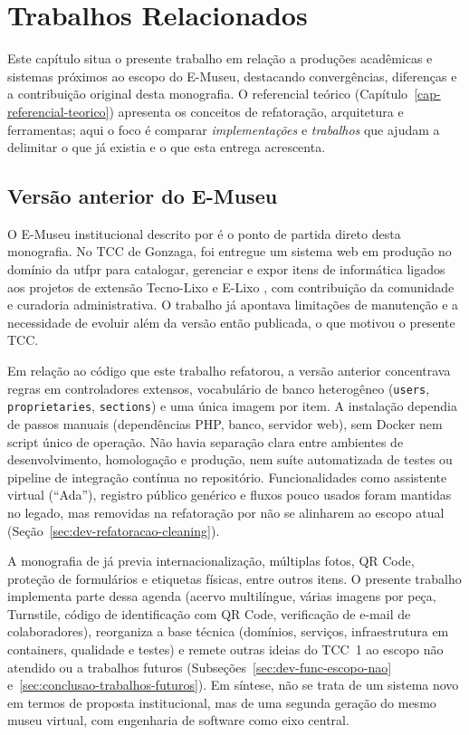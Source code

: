\chapter{Trabalhos Relacionados}\label{cap:trabalhos-relacionados}

Este capítulo situa o presente trabalho em relação a produções acadêmicas e sistemas próximos ao escopo do E-Museu, destacando convergências, diferenças e a contribuição original desta monografia. O referencial teórico (Capítulo~\ref{cap-referencial-teorico}) apresenta os conceitos de refatoração, arquitetura e ferramentas; aqui o foco é comparar \textit{implementações} e \textit{trabalhos} que ajudam a delimitar o que já existia e o que esta entrega acrescenta.


\section{Versão anterior do E-Museu}\label{sec:trab-emuseu-v1}

O E-Museu institucional descrito por  é o ponto de partida direto desta monografia. No TCC de Gonzaga, foi entregue um sistema web em produção no domínio da \acrshort{utfpr} para catalogar, gerenciar e expor itens de informática ligados aos projetos de extensão Tecno-Lixo e E-Lixo \cite{ribeiro2024tecno,re2021cartilha}, com contribuição da comunidade e curadoria administrativa. O trabalho já apontava limitações de manutenção e a necessidade de evoluir além da versão então publicada, o que motivou o presente TCC.

Em relação ao código que este trabalho refatorou, a versão anterior concentrava regras em controladores extensos, vocabulário de banco heterogêneo (\texttt{users}, \texttt{proprietaries}, \texttt{sections}) e uma única imagem por item. A instalação dependia de passos manuais (dependências PHP, banco, servidor web), sem Docker nem script único de operação. Não havia separação clara entre ambientes de desenvolvimento, homologação e produção, nem suíte automatizada de testes ou pipeline de integração contínua no repositório. Funcionalidades como assistente virtual (``Ada''), registro público genérico e fluxos pouco usados foram mantidas no legado, mas removidas na refatoração por não se alinharem ao escopo atual (Seção~\ref{sec:dev-refatoracao-cleaning}).

A monografia de  já previa internacionalização, múltiplas fotos, QR Code, proteção de formulários e etiquetas físicas, entre outros itens. O presente trabalho implementa parte dessa agenda (acervo multilíngue, várias imagens por peça, Turnstile, código de identificação com QR Code, verificação de e-mail de colaboradores), reorganiza a base técnica (domínios, serviços, infraestrutura em containers, qualidade e testes) e remete outras ideias do TCC~1 ao escopo não atendido ou a trabalhos futuros (Subseções~\ref{sec:dev-func-escopo-nao} e~\ref{sec:conclusao-trabalhos-futuros}). Em síntese, não se trata de um sistema novo em termos de proposta institucional, mas de uma segunda geração do mesmo museu virtual, com engenharia de software como eixo central.



